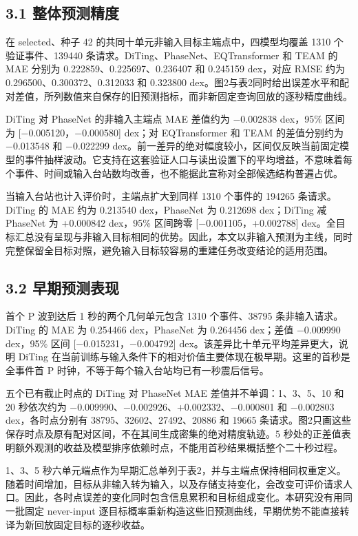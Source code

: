 \documentclass[UTF8,a4paper,11pt]{ctexart}
\begin{document}
\subsection*{3.1 整体预测精度}

在 selected、种子 42 的共同十单元非输入目标主端点中，四模型均覆盖 1310 个验证事件、139440 条请求。DiTing、PhaseNet、EQTransformer 和 TEAM 的 MAE 分别为 0.222859、0.225697、0.236407 和 0.245159 dex，对应 RMSE 约为 0.296500、0.300372、0.312033 和 0.323800 dex。图2与表2同时给出误差水平和配对差值，所列数值来自保存的旧预测指标，而非新固定查询回放的逐秒精度曲线。

DiTing 对 PhaseNet 的非输入主端点 MAE 差值约为 −0.002838 dex，95\% 区间为 [−0.005120，−0.000580] dex；对 EQTransformer 和 TEAM 的差值分别约为 −0.013548 和 −0.022299 dex。前一差异的绝对幅度较小，区间仅反映当前固定模型的事件抽样波动。它支持在这套验证人口与读出设置下的平均增益，不意味着每个事件、时间或输入台站数均改善，也不能据此宣称对全部候选结构普遍占优。

当输入台站也计入评价时，主端点扩大到同样 1310 个事件的 194265 条请求。DiTing 的 MAE 约为 0.213540 dex，PhaseNet 为 0.212698 dex；DiTing 减 PhaseNet 为 +0.000842 dex，95\% 区间跨零 [−0.001105，+0.002788] dex。全目标汇总没有呈现与非输入目标相同的优势。因此，本文以非输入预测为主线，同时完整保留全目标对照，避免输入目标较容易的重建任务改变结论的适用范围。

\subsection*{3.2 早期预测表现}

首个 P 波到达后 1 秒的两个几何单元包含 1310 个事件、38795 条非输入请求。DiTing 的 MAE 为 0.254466 dex，PhaseNet 为 0.264456 dex；差值 −0.009990 dex，95\% 区间 [−0.015231，−0.004792] dex。该差异比十单元平均差异更大，说明 DiTing 在当前训练与输入条件下的相对价值主要体现在极早期。这里的首秒是全事件首 P 时钟，不等于每个输入台站均已有一秒震后信号。

五个已有截止时点的 DiTing 对 PhaseNet MAE 差值并不单调：1、3、5、10 和 20 秒依次约为 −0.009990、−0.002926、+0.002332、−0.000801 和 −0.002803 dex，各时点分别有 38795、32602、27492、20886 和 19665 条请求。图2只画这些保存时点及原有配对区间，不在其间生成密集的绝对精度轨迹。5 秒处的正差值表明额外观测的收益及模型排序依赖时点，不能用首秒结果概括整个二十秒过程。

1、3、5 秒六单元端点作为早期汇总单列于表2，并与主端点保持相同权重定义。随着时间增加，目标从非输入转为输入，以及存储支持变化，会改变可评价请求人口。因此，各时点误差的变化同时包含信息累积和目标组成变化。本研究没有用同一批固定 never-input 逐目标概率重新构造这些旧预测曲线，早期优势不能直接转译为新回放固定目标的逐秒收益。
\end{document}
